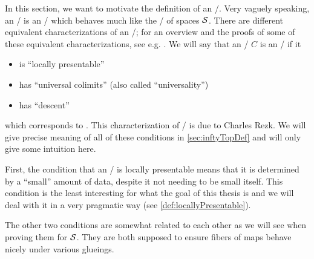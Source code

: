 In this section, we want to motivate the definition of an \inftytop/.
Very vaguely speaking, an \inftytop/ is an \inftycat/ which behaves much like the \inftycat/ of spaces $\mathcal{S}$.
There are different equivalent characterizations of an \inftytop/; for an overview and the proofs of some of these equivalent characterizations, see e.g. \cite[\S 6.1]{HTT}.
We will say that an \inftycat/ $C$ is an \inftytop/ if it 
\begin{itemize} 
    \item is ``locally presentable''
    \item has ``universal colimits'' (also called ``universality'')
    \item has ``descent'' 
\end{itemize}
which corresponds to \cite[Theorem 6.1.0.6 (2)]{HTT}.
This characterization of \inftytops/ is due to Charles Rezk.
We will give precise meaning of all of these conditions in \cref{sec:inftyTopDef} and will only give some intuition here.

First, the condition that an \inftycat/ is locally presentable means that it is determined by a ``small'' amount of data, despite it not needing to be small itself.
This condition is the least interesting for what the goal of this thesis is and we will deal with it in a very pragmatic way (see \cref{def:locallyPresentable}).

The other two conditions are somewhat related to each other as we will see when proving them for $\mathcal{S}$.
They are both supposed to ensure fibers of maps behave nicely under various glueings.

